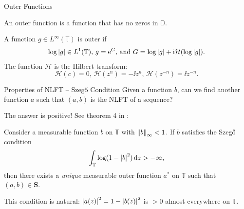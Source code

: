 \begin{frame}{Outer Functions}
    \begin{definition}
        An outer function is a function that has no zeros in $\mathbb{D}$.
    \end{definition}

    \begin{lemma}
        A function $g\in L^\infty(\mathbb{T})$ is outer if 
        \begin{equation}
            \log\left|{g}\right|\in L^1(\mathbb{T}) \text{, } g=\mathrm{e}^G \text{, and } G=\log\left|{g}\right| + \mathrm{i} \mathcal{H}(\log\left|{g}\right|).
        \end{equation}
        The function $\mathcal{H}$ is the Hilbert transform:
        \begin{equation}
            \mathcal{H}(c) = 0 \text{, } \mathcal{H}(z^n) = -\ii z^n \text{, } \mathcal{H}(z^{-n}) = \ii z^{-n}.
        \end{equation}
    \end{lemma}
\end{frame}
    
\begin{frame}{Properties of NLFT -- Szeg\H{o} Condition}
    Given a function $b$, can we find another function $a$ such that $(a,b)$ is the NLFT of a sequence?

    The answer is positive! See theorem 4 in \cite{Szego}:
    \begin{lemma}
        Consider a measurable function $b$ on $\mathbb{T}$ with $\left\lVert{b}\right\rVert_\infty<1$. If $b$ satisfies the Szeg\H{o} condition
        \begin{equation}
            \int_{\mathbb{T}} \log(1-\left|{b}\right|^2)\,\mathrm{d} z > -\infty,
        \end{equation}
        then there exists a \textit{unique} measurable outer function $a^*$ on $\mathbb{T}$ such that $(a,b)\in\mathbf{S}$.
    \end{lemma}
    
    This condition is natural: $\left|{a(z)}\right|^2 = 1-\left|{b(z)}\right|^2$ is $>0$ almost everywhere on $\mathbb{T}$.
\end{frame}


